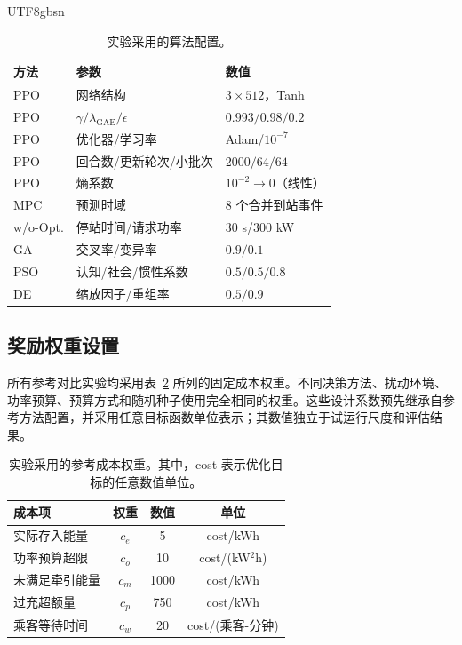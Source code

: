 \documentclass[conference]{IEEEtran}
\begin{document}
\begin{CJK*}{UTF8}{gbsn}
\begin{table}[t]
\centering
\caption{实验采用的算法配置。}
\label{tab:algorithm_settings}
\footnotesize
\setlength{\tabcolsep}{3pt}
\begin{tabular}{lll}
\toprule
方法 & 参数 & 数值 \\
\midrule
PPO & 网络结构 & $3\times512$，Tanh \\
PPO & $\gamma/\lambda_{\mathrm{GAE}}/\epsilon$ & $0.993/0.98/0.2$ \\
PPO & 优化器/学习率 & Adam/$10^{-7}$ \\
PPO & 回合数/更新轮次/小批次 & $2000/64/64$ \\
PPO & 熵系数 & $10^{-2}\rightarrow0$（线性） \\
MPC & 预测时域 & 8 个合并到站事件 \\
w/o-Opt. & 停站时间/请求功率 & 30 s/300 kW \\
GA & 交叉率/变异率 & $0.9/0.1$ \\
PSO & 认知/社会/惯性系数 & $0.5/0.5/0.8$ \\
DE & 缩放因子/重组率 & $0.5/0.9$ \\
\bottomrule
\end{tabular}
\end{table}

\subsection{奖励权重设置}
所有参考对比实验均采用表~\ref{tab:cost_weights} 所列的固定成本权重。不同决策方法、扰动环境、功率预算、预算方式和随机种子使用完全相同的权重。这些设计系数预先继承自参考方法配置，并采用任意目标函数单位表示；其数值独立于试运行尺度和评估结果。

\begin{table}[t]
\centering
\caption{实验采用的参考成本权重。其中，cost 表示优化目标的任意数值单位。}
\label{tab:cost_weights}
\footnotesize
\setlength{\tabcolsep}{3pt}
\begin{tabular}{lccc}
\toprule
成本项 & 权重 & 数值 & 单位 \\
\midrule
实际存入能量 & $c_e$ & 5 & cost/kWh \\
功率预算超限 & $c_o$ & 10 & cost/(kW$^2$h) \\
未满足牵引能量 & $c_m$ & 1000 & cost/kWh \\
过充超额量 & $c_p$ & 750 & cost/kWh \\
乘客等待时间 & $c_w$ & 20 & cost/(乘客-分钟) \\
\bottomrule
\end{tabular}
\end{table}


\end{CJK*}
\end{document}
